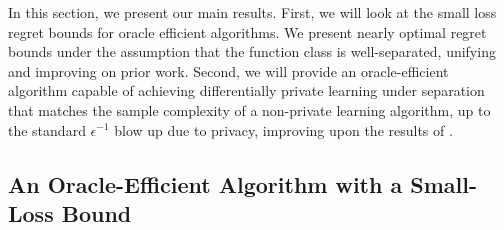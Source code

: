 


In this section, we present our main results. 
First, we will look at the small loss regret bounds for oracle efficient algorithms. 
We present nearly optimal regret bounds under the assumption that the function class is well-separated, unifying and improving on prior work.   Second, we will provide an oracle-efficient algorithm capable of achieving differentially private learning under separation that matches the sample complexity of a non-private learning algorithm, up to the standard $\epsilon^{-1}$ blow up due to privacy, improving upon the results of \cite{block2024oracle}.



\subsection{An Oracle-Efficient Algorithm with a Small-Loss Bound }\label{ssec:small-loss-bounds}

